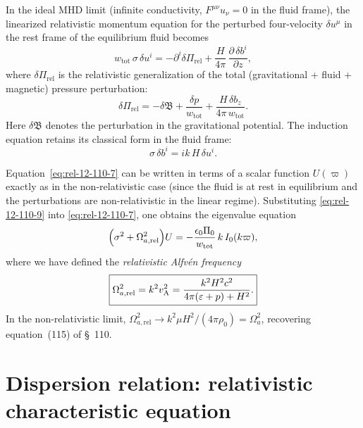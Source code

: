 In the ideal MHD limit (infinite conductivity, $F^{\mu\nu}u_{\nu}=0$
in the fluid frame), the linearized relativistic momentum equation
for the perturbed four-velocity $\delta u^{\mu}$ in the rest frame of
the equilibrium fluid becomes
\begin{equation}
\label{eq:rel-12-110-7}
w_{\mathrm{tot}}\,\sigma\,\delta u^{i}
= -\partial^{i}\delta\Pi_{\mathrm{rel}}
+ \frac{H}{4\pi}\,\frac{\partial\,\delta b^{i}}{\partial z},
\end{equation}
where $\delta\Pi_{\mathrm{rel}}$ is the relativistic generalization of
the total (gravitational + fluid + magnetic) pressure perturbation:
\begin{equation}
\label{eq:rel-12-110-8}
\delta\Pi_{\mathrm{rel}} = -\delta\mathfrak{B}
+ \frac{\delta p}{w_{\mathrm{tot}}}
+ \frac{H\,\delta b_{z}}{4\pi\,w_{\mathrm{tot}}}.
\end{equation}
Here $\delta\mathfrak{B}$ denotes the perturbation in the
gravitational potential.  The induction equation retains its classical
form in the fluid frame:
\begin{equation}
\label{eq:rel-12-110-9}
\sigma\,\delta b^{i} = ik\,H\,\delta u^{i}.
\end{equation}

Equation~\eqref{eq:rel-12-110-7} can be written in terms of a scalar
function $U(\varpi)$ exactly as in the non-relativistic case (since
the fluid is at rest in equilibrium and the perturbations are
non-relativistic in the linear regime).  Substituting
\eqref{eq:rel-12-110-9} into \eqref{eq:rel-12-110-7}, one obtains the
eigenvalue equation
\begin{equation}
\label{eq:rel-12-110-10}
\Bigl(\sigma^{2} + \Omega_{a,\mathrm{rel}}^{2}\Bigr) U
= -\frac{\epsilon_{0}\Pi_{0}}{w_{\mathrm{tot}}}\,k\,I_{0}(k\varpi),
\end{equation}
where we have defined the \emph{relativistic Alfv\'en frequency}
\begin{equation}
\label{eq:rel-12-110-11}
\boxed{\Omega_{a,\mathrm{rel}}^{2}
= k^{2}v_{\mathrm{A}}^{2}
= \frac{k^{2} H^{2} c^{2}}{4\pi(\varepsilon+p) + H^{2}}.}
\end{equation}
In the non-relativistic limit,
$\Omega_{a,\mathrm{rel}}^{2} \to k^{2}\mu H^{2}/(4\pi\rho_{0})
= \Omega_{a}^{2}$, recovering equation~(115) of \S~110.

\section{Dispersion relation: relativistic characteristic equation}
\label{sec:rel-12-110-dispersion}

